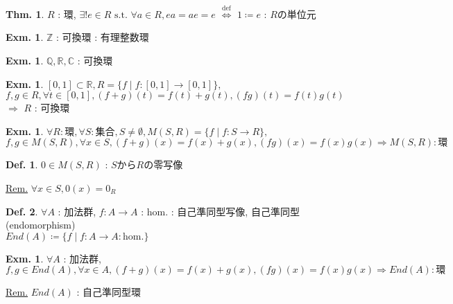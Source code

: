 \documentclass[uplatex,dvipdfmx,9pt]{beamer}
\newcommand{\defarrow}{\overset{\mathrm{def}}{\Leftrightarrow}}
\newcommand{\st}{\text{ s.t. }}
\newcounter{textExmCount}
\theoremstyle{definition} %
\newtheorem{defn}{Def.}[subsection] %
\newtheorem{thm}{Thm.}[subsection] %
\theoremstyle{example}
\newtheorem{exmText}[textExmCount]{Exm.}
\begin{document}
      \begin{frame}
        
        \begin{thm}
          $R$ : 環, $\exists! e \in R \st \forall a \in R, ea = ae = e$ $\defarrow$ $1 \coloneqq e$ : $R$の\alert{単位元}
        \end{thm}

        \begin{exmText}
          $\mathbb{Z}$ : 可換環 : \alert{有理整数環}
        \end{exmText}

        \begin{exmText}
          $\mathbb{Q}, \mathbb{R}, \mathbb{C}$ : 可換環
        \end{exmText}

        \begin{exmText}
          $[0, 1] \subset \mathbb{R}, R = \{f \mid f\colon [0, 1] \to [0, 1]\},$ \\
          $f, g \in R, \forall t \in [0, 1], (f + g)(t) = f(t) + g(t), (fg)(t) = f(t)g(t)$ $\Rightarrow$ $R$ : 可換環
        \end{exmText}

      \end{frame}

      \begin{frame}

        \begin{exmText}
          $\forall R : \text{環}, \forall S : \text{集合}, S \ne \emptyset, M(S, R) = \{f \mid f\colon S \to R\},$ \\
          $f, g \in M(S, R), \forall x \in S, (f + g)(x) = f(x) + g(x), (fg)(x) = f(x)g(x) \Rightarrow M(S, R) : \text{環}$
        \end{exmText}

        \begin{defn}
          $0 \in M(S, R)$ : $S$から$R$の\alert{零写像} \\
        \end{defn}
        \underline{Rem.} $\forall x \in S, 0(x) = 0_R$

        \begin{defn}
          $\forall A$ : 加法群, $f\colon A \to A$ : hom. : \alert{自己準同型写像, 自己準同型}(endomorphism) \\
          $End(A) \coloneqq \{f \mid f\colon A \to A : \text{hom.}\}$
        \end{defn}

        \begin{exmText}
          $\forall A$ : 加法群, \\
          $f, g \in End(A), \forall x \in A, (f + g)(x) = f(x) + g(x), (fg)(x) = f(x)g(x) \Rightarrow End(A) : \text{環}$
        \end{exmText}
        \underline{Rem.} $End(A)$ : \alert{自己準同型環}
        
      \end{frame}
\end{document}
